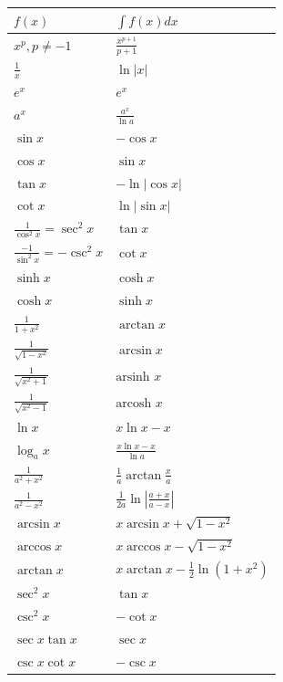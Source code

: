 \begin{center}
\footnotesize
\setlength{\tabcolsep}{2pt}
\begin{tabularx}{\columnwidth}{|>{\hsize=0.6\hsize\raggedright\arraybackslash}X|>{\hsize=1.4\hsize\raggedright\arraybackslash}X|}
\hline
$f(x)$ & $\int f(x) dx$ \\ \hline
$x^p, p \ne -1$ & $\frac{x^{p+1}}{p+1}$ \\ \hline
$\frac{1}{x}$ & $\ln|x|$ \\ \hline
$e^x$ & $e^x$ \\ \hline
$a^x$ & $\frac{a^x}{\ln a}$ \\ \hline
$\sin x$ & $-\cos x$ \\ \hline
$\cos x$ & $\sin x$ \\ \hline
$\tan x$ & $-\ln|\cos x|$ \\ \hline
$\cot x$ & $\ln|\sin x|$ \\ \hline
$\frac{1}{\cos^2 x} = \sec^2 x$ & $\tan x$ \\ \hline
$\frac{-1}{\sin^2 x} = -\csc^2 x$ & $\cot x$ \\ \hline
$\sinh x$ & $\cosh x$ \\ \hline
$\cosh x$ & $\sinh x$ \\ \hline
$\frac{1}{1+x^2}$ & $\arctan x$ \\ \hline
$\frac{1}{\sqrt{1-x^2}}$ & $\arcsin x$ \\ \hline
$\frac{1}{\sqrt{x^2+1}}$ & $\text{arsinh } x$ \\ \hline
$\frac{1}{\sqrt{x^2-1}}$ & $\text{arcosh } x$ \\ \hline
$\ln x$ & $x \ln x - x$ \\ \hline
$\log_a x$ & $\frac{x \ln x - x}{\ln a}$ \\ \hline
$\frac{1}{a^2+x^2}$ & $\frac{1}{a}\arctan\frac{x}{a}$ \\ \hline
$\frac{1}{a^2-x^2}$ & $\frac{1}{2a}\ln|\frac{a+x}{a-x}|$ \\ \hline
$\arcsin x$ & $x\arcsin x + \sqrt{1-x^2}$ \\ \hline
$\arccos x$ & $x\arccos x - \sqrt{1-x^2}$ \\ \hline
$\arctan x$ & $x\arctan x - \frac{1}{2}\ln(1+x^2)$ \\ \hline
$\sec^2 x$ & $\tan x$ \\ \hline
$\csc^2 x$ & $-\cot x$ \\ \hline
$\sec x \tan x$ & $\sec x$ \\ \hline
$\csc x \cot x$ & $-\csc x$ \\ \hline

\end{tabularx}
\end{center}
